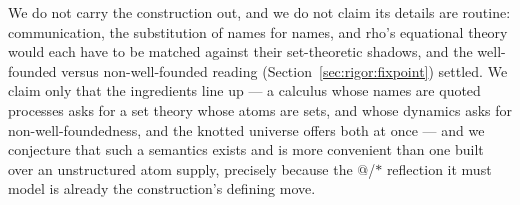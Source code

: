 We do not carry the construction out, and we do not claim its details are routine:
communication, the substitution of names for names, and rho's equational theory
would each have to be matched against their set-theoretic shadows, and the
well-founded versus non-well-founded reading (Section~\ref{sec:rigor:fixpoint})
settled. We claim only that the ingredients line up --- a calculus whose names are
quoted processes asks for a set theory whose atoms are sets, and whose dynamics
asks for non-well-foundedness, and the knotted universe offers both at once --- and
we conjecture that such a semantics exists and is more convenient than one built
over an unstructured atom supply, precisely because the $@$/$*$ reflection it must
model is already the construction's defining move.

